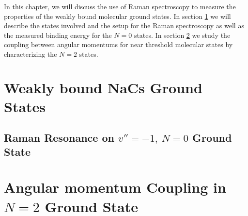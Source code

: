 In this chapter, we will discuss the use of Raman spectroscopy
to measure the properties of the weakly bound molecular ground states.
In section \ref{ch:raman-spectroscopy:states}
we will describe the states involved and the setup for the Raman spectroscopy
as well as the measured binding energy for the $N=0$ states.
In section \ref{ch:raman-spectroscopy:n2}
we study the coupling between angular momentums for near threshold molecular states
by characterizing the $N=2$ states.

\section{Weakly bound NaCs Ground States}
\label{ch:raman-spectroscopy:states}


\subsection{Raman Resonance on $v''=-1,\ N=0$ Ground State}

\section{Angular momentum Coupling in $N=2$ Ground State}
\label{ch:raman-spectroscopy:n2}


